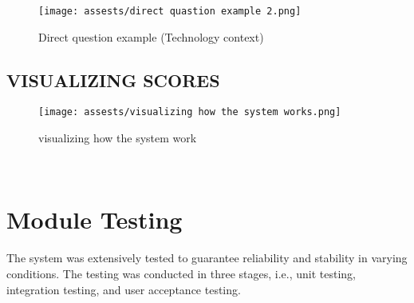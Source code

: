 \documentclass[conference]{IEEEtran}
\begin{document}
  
\begin{figure}[H]
  \centering
  \texttt{[image: assests/direct quastion example 2.png]}
  \caption{Direct question example (Technology context)}
  \label{fig:Direct question example (Technology context)}
  \end{figure}

\subsection{VISUALIZING SCORES}

  
\begin{figure}[H]
  \centering
  \texttt{[image: assests/visualizing how the system works.png]}
  \caption{visualizing how the system work}
  \label{fig:visualizing how the system work}
  \end{figure}
\\\section{Module Testing}
The system was extensively tested to guarantee reliability and stability in varying conditions. The testing was conducted in three stages, i.e., unit testing, integration testing, and user acceptance testing.
\end{document}

